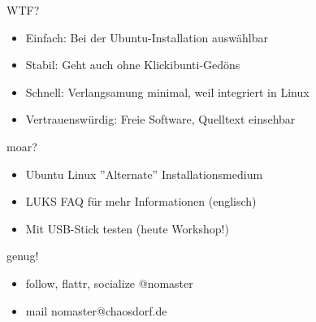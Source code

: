 \documentclass[aspectratio=1610]{beamer}
\begin{document}
  \begin{frame}{WTF?}
    \begin{itemize}
      \item{Einfach: Bei der Ubuntu-Installation auswählbar}
      \pause
      \item{Stabil: Geht auch ohne Klickibunti-Gedöns}
      \pause
      \item{Schnell: Verlangsamung minimal, weil integriert in Linux}
      \pause
      \item{Vertrauenswürdig: Freie Software, Quelltext einsehbar}
    \end{itemize}
  \end{frame}

  \begin{frame}{moar?}
    \begin{itemize}
      \item{Ubuntu Linux ''Alternate'' Installationsmedium}
      \pause
      \item{LUKS FAQ für mehr Informationen (englisch)}
      \pause
      \item{Mit USB-Stick testen (heute Workshop!)}
    \end{itemize}
  \end{frame}

  \begin{frame}{genug!}
    \begin{itemize}
      \item{follow, flattr, socialize @nomaster}
      \item{mail nomaster@chaosdorf.de}
    \end{itemize}
  \end{frame}
\end{document}
